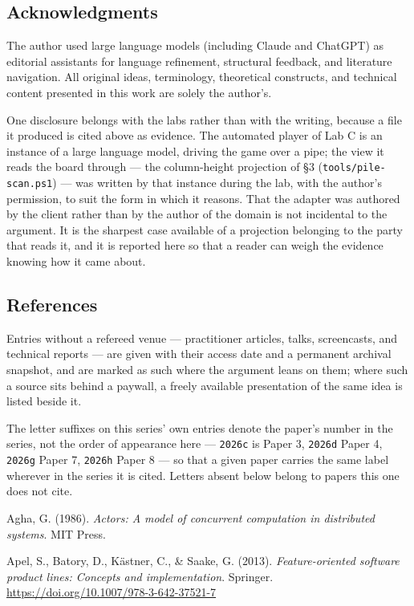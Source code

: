 \documentclass[
]{article}
\begin{document}
\subsection{Acknowledgments}\label{acknowledgments}

The author used large language models (including Claude and ChatGPT) as
editorial assistants for language refinement, structural feedback, and
literature navigation. All original ideas, terminology, theoretical
constructs, and technical content presented in this work are solely the
author's.

One disclosure belongs with the labs rather than with the writing,
because a file it produced is cited above as evidence. The automated
player of Lab C is an instance of a large language model, driving the
game over a pipe; the view it reads the board through --- the
column-height projection of §3 (\texttt{tools/pile-scan.ps1}) --- was
written by that instance during the lab, with the author's permission,
to suit the form in which it reasons. That the adapter was authored by
the client rather than by the author of the domain is not incidental to
the argument. It is the sharpest case available of a projection
belonging to the party that reads it, and it is reported here so that a
reader can weigh the evidence knowing how it came about.

\subsection{References}\label{references}

Entries without a refereed venue --- practitioner articles, talks,
screencasts, and technical reports --- are given with their access date
and a permanent archival snapshot, and are marked as such where the
argument leans on them; where such a source sits behind a paywall, a
freely available presentation of the same idea is listed beside it.

The letter suffixes on this series' own entries denote the paper's
number in the series, not the order of appearance here ---
\texttt{2026c} is Paper 3, \texttt{2026d} Paper 4, \texttt{2026g} Paper
7, \texttt{2026h} Paper 8 --- so that a given paper carries the same
label wherever in the series it is cited. Letters absent below belong to
papers this one does not cite.

Agha, G. (1986). \emph{Actors: A model of concurrent computation in
distributed systems}. MIT Press.

Apel, S., Batory, D., Kästner, C., \& Saake, G. (2013).
\emph{Feature-oriented software product lines: Concepts and
implementation}. Springer.
\url{https://doi.org/10.1007/978-3-642-37521-7}
\end{document}
